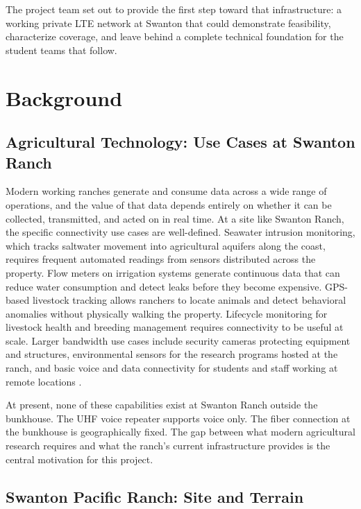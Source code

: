 \documentclass[
    left=1.5in,
    right=1.25in,
    top=1.25in,
    bottom=1.25in
]{CalPolySeniorProject}
\begin{document}
The project team set out to provide the first step toward that infrastructure: a
working private LTE network at Swanton that could demonstrate feasibility,
characterize coverage, and leave behind a complete technical foundation for the
student teams that follow.

\section{Background}

\subsection{Agricultural Technology: Use Cases at Swanton Ranch}

Modern working ranches generate and consume data across a wide range of
operations, and the value of that data depends entirely on whether it can be
collected, transmitted, and acted on in real time. At a site like Swanton Ranch,
the specific connectivity use cases are well-defined. Seawater intrusion
monitoring, which tracks saltwater movement into agricultural aquifers along the
coast, requires frequent automated readings from sensors distributed across the
property. Flow meters on irrigation systems generate continuous data that can
reduce water consumption and detect leaks before they become expensive.
GPS-based livestock tracking allows ranchers to locate animals and detect
behavioral anomalies without physically walking the property. Lifecycle
monitoring for livestock health and breeding management requires connectivity to
be useful at scale. Larger bandwidth use cases include security cameras
protecting equipment and structures, environmental sensors for the research
programs hosted at the ranch, and basic voice and data connectivity for students
and staff working at remote locations \autocite{polly2024agtech}.

At present, none of these capabilities exist at Swanton Ranch outside the
bunkhouse. The UHF voice repeater supports voice only. The fiber connection at
the bunkhouse is geographically fixed. The gap between what modern agricultural
research requires and what the ranch's current infrastructure provides is the
central motivation for this project.

\subsection{Swanton Pacific Ranch: Site and Terrain}
\end{document}
